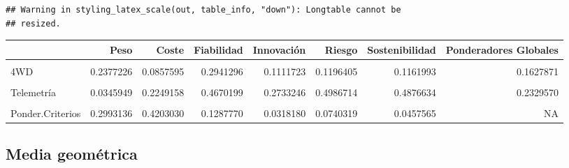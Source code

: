 \documentclass[
]{article}
\begin{document}
\begin{verbatim}
## Warning in styling_latex_scale(out, table_info, "down"): Longtable cannot be
## resized.
\end{verbatim}

\begin{longtable}[t]{lrrrrrrr}
\toprule
 & Peso & Coste & Fiabilidad & Innovación & Riesgo & Sostenibilidad & Ponderadores Globales\\
\midrule
\cellcolor{gray!10}{Monocasco} & \cellcolor{gray!10}{0.4885995} & \cellcolor{gray!10}{0.0380167} & \cellcolor{gray!10}{0.0372497} & \cellcolor{gray!10}{0.4715277} & \cellcolor{gray!10}{0.0708690} & \cellcolor{gray!10}{0.0777909} & \cellcolor{gray!10}{0.1908290}\\
4WD & 0.2377226 & 0.0857595 & 0.2941296 & 0.1111723 & 0.1196405 & 0.1161993 & 0.1627871\\
\cellcolor{gray!10}{Batería} & \cellcolor{gray!10}{0.0532047} & \cellcolor{gray!10}{0.5361012} & \cellcolor{gray!10}{0.1398637} & \cellcolor{gray!10}{0.1111723} & \cellcolor{gray!10}{0.2733497} & \cellcolor{gray!10}{0.0421870} & \cellcolor{gray!10}{0.2849653}\\
Telemetría & 0.0345949 & 0.2249158 & 0.4670199 & 0.2733246 & 0.4986714 & 0.4876634 & 0.2329570\\
\cellcolor{gray!10}{Aerodinámica} & \cellcolor{gray!10}{0.1858782} & \cellcolor{gray!10}{0.1152067} & \cellcolor{gray!10}{0.0617371} & \cellcolor{gray!10}{0.0328030} & \cellcolor{gray!10}{0.0374694} & \cellcolor{gray!10}{0.2761594} & \cellcolor{gray!10}{0.1284616}\\
\addlinespace
Ponder.Criterios & 0.2993136 & 0.4203030 & 0.1287770 & 0.0318180 & 0.0740319 & 0.0457565 & NA\\
\bottomrule
\end{longtable}

\subsection{Media geométrica}\label{media-geomuxe9trica}
\end{document}
